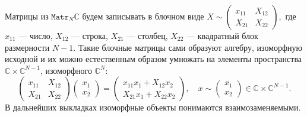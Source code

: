 Матрицы из \( \mathtt{Matr}_N\mathbb{C} \) будем записывать в блочном виде
\( X \sim
    \begin{pmatrix}
    x_{11} & X_{12} \\
    X_{21} & X_{22}
    \end{pmatrix}, \)
    где \( x_{11} \) --- число,
    \( X_{12} \) --- строка, \( X_{21} \) --- столбец,
    \( X_{22} \) --- квадратный блок размерности \( N-1 \).
Такие блочные матрицы сами образуют алгебру, изоморфную исходной
и их можно естественным образом умножать
на элементы пространства \( \mathbb{C}\times\mathbb{C}^{N-1} \),
изоморфного \( \mathbb{C}^N \):
\[
    \begin{pmatrix}
    x_{11} & X_{12} \\
    X_{21} & X_{22}
    \end{pmatrix}
    \begin{pmatrix} x_1 \\ x_2 \end{pmatrix}
  = \begin{pmatrix}
      x_{11} x_1 + X_{12} x_2 \\
      X_{21} x_1 + X_{22} x_2
      \end{pmatrix},\quad x \sim \begin{pmatrix} x_1 \\ x_2 \end{pmatrix}\in \mathbb{C}\times\mathbb{C}^{N-1}.
    \]
В дальнейших выкладках изоморфные объекты понимаются взаимозаменяемыми.


